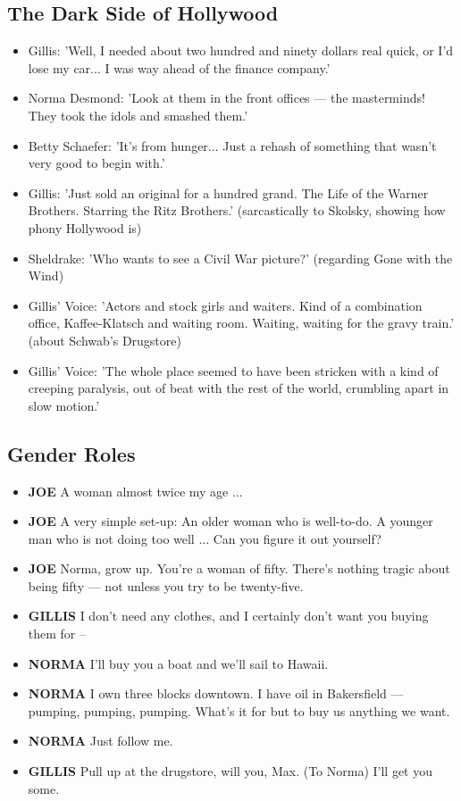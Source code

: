 \documentclass[a4paper]{article}
\begin{document}
\subsection{The Dark Side of Hollywood}
\begin{itemize}
  \item Gillis: 'Well, I needed about two hundred and ninety dollars real quick, or I'd lose my car... I was way ahead of the finance company.'
  \item Norma Desmond: 'Look at them in the front offices — the masterminds! They took the idols and smashed them.'
  \item Betty Schaefer: 'It's from hunger... Just a rehash of something that wasn't very good to begin with.'
  \item Gillis: 'Just sold an original for a hundred grand. The Life of the Warner Brothers. Starring the Ritz Brothers.' (sarcastically to Skolsky, showing how phony Hollywood is)
  \item Sheldrake: 'Who wants to see a Civil War picture?' (regarding Gone with the Wind)
  \item Gillis' Voice: 'Actors and stock girls and waiters. Kind of a combination office, Kaffee-Klatsch and waiting room. Waiting, waiting for the gravy train.' (about Schwab’s Drugstore)
  \item Gillis' Voice: 'The whole place seemed to have been stricken with a kind of creeping paralysis, out of beat with the rest of the world, crumbling apart in slow motion.'\\
\end{itemize}

\subsection{Gender Roles}
\begin{itemize}
\item \textbf{JOE} A woman almost twice my age ...
\item \textbf{JOE} A very simple set-up: An older woman who is well-to-do. A younger man who is not doing too well ... Can you figure it out yourself?
\item \textbf{JOE} Norma, grow up. You're a woman of fifty. There's nothing tragic about being fifty — not unless you try to be twenty-five.
\item \textbf{GILLIS} I don't need any clothes, and I certainly don't want you buying them for --
\item \textbf{NORMA} I'll buy you a boat and we'll sail to Hawaii.
\item \textbf{NORMA} I own three blocks downtown. I have oil in Bakersfield — pumping, pumping, pumping. What's it for but to buy us anything we want.
\item \textbf{NORMA} Just follow me.
\item \textbf{GILLIS} Pull up at the drugstore, will you, Max. (To Norma) I'll get you some.
\end{itemize}
\end{document}
